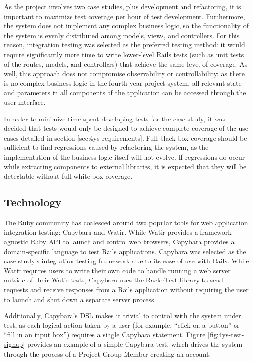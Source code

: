 \documentclass[document.tex]{subfiles}
\begin{document}
As the project involves two case studies, plus development and refactoring,
it is important to maximize test coverage per hour of test development. Furthermore, the system does not implement any complex business logic, so the functionality of the system is evenly distributed among models, views, and controllers. For this reason, integration testing was selected as the preferred testing method: it would require significantly more time to write lower-level Rails tests (such as unit tests of the routes, models, and controllers) that achieve the same level of coverage. As well, this approach does not compromise observability or controllability: as there is no complex business logic in the fourth year project system, all relevant state and parameters in all components of the application can be accessed through the user interface.

In order to minimize time spent developing tests for the case study, it was decided that tests would only be designed to achieve complete coverage of the use cases detailed in section \ref{sec:4ys-requirements}. Full black-box coverage should be sufficient to find regressions caused by refactoring the system, as the implementation of the business logic itself will not evolve. If regressions do occur while extracting components to external libraries, it is expected that they will be detectable without full white-box coverage.



\subsection {Technology}

The Ruby community has coalesced around two popular tools for web application integration testing: Capybara and Watir. While Watir provides a framework-agnostic Ruby API to launch and control web browsers, Capybara provides a domain-specific language to test Rails applications. Capybara was selected as the case study's integration testing framework due to its ease of use with Rails. While Watir requires users to write their own code to handle running a web server outside of their Watir tests, Capybara uses the Rack::Test library to send requests and receive responses from a Rails application without requiring the user to launch and shut down a separate server process.

Additionally, Capybara's DSL makes it trivial to control with the system under test, as each logical action taken by a user (for example, ``click on a button'' or ``fill in an input box'') requires a single Capybara statement. Figure \ref{fig:4ys-test-signup} provides an example of a simple Capybara test, which drives the system through the process of a Project Group Member creating an account.
\end{document}
